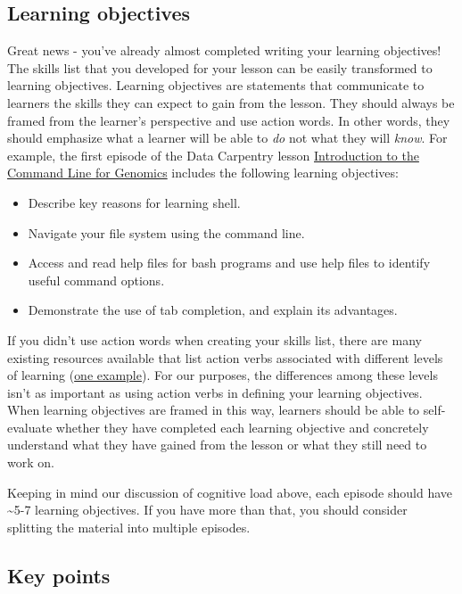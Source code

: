 \documentclass[]{book}
\providecommand{\tightlist}{%
  \setlength{\itemsep}{0pt}\setlength{\parskip}{0pt}}
\begin{document}
\hypertarget{learning-objectives}{%
\subsection{Learning objectives}\label{learning-objectives}}

Great news - you've already almost completed writing your learning objectives! The skills list that you developed
for your lesson can be easily transformed to learning objectives. Learning objectives are statements that
communicate to learners the skills they can expect to gain from the lesson. They should always be framed
from the learner's perspective and use action words. In other words, they should emphasize what a learner
will be able to \emph{do} not what they will \emph{know}. For example, the first episode of the Data Carpentry lesson \href{https://datacarpentry.org/shell-genomics/}{Introduction to the Command Line for Genomics} includes the
following learning objectives:

\begin{itemize}
\tightlist
\item
  Describe key reasons for learning shell.
\item
  Navigate your file system using the command line.
\item
  Access and read help files for bash programs and use help files to identify useful command options.
\item
  Demonstrate the use of tab completion, and explain its advantages.
\end{itemize}

If you didn't use action words when creating your skills list, there are many existing resources available that
list action verbs associated with different levels of learning (\href{https://tips.uark.edu/blooms-taxonomy-verb-chart/}{one example}). For our purposes, the differences among these
levels isn't as important as using action verbs in defining your learning objectives. When learning objectives
are framed in this way, learners should be able to self-evaluate whether they have completed each learning
objective and concretely understand what they have gained from the lesson or what they still need to work on.

Keeping in mind our discussion of cognitive load above, each episode should have \textasciitilde{}5-7 learning objectives. If you
have more than that, you should consider splitting the material into multiple episodes.

\hypertarget{key-points}{%
\subsection{Key points}\label{key-points}}
\end{document}
